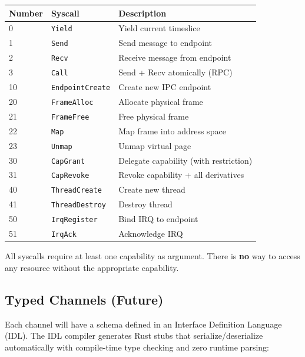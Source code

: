\documentclass[11pt,a4paper]{article}
\begin{document}
\begin{center}
\begin{tabularx}{\textwidth}{llX}
\toprule
\textbf{Number} & \textbf{Syscall} & \textbf{Description} \\
\midrule
0  & \texttt{Yield}          & Yield current timeslice \\
1  & \texttt{Send}           & Send message to endpoint \\
2  & \texttt{Recv}           & Receive message from endpoint \\
3  & \texttt{Call}           & Send + Recv atomically (RPC) \\
\midrule
10 & \texttt{EndpointCreate} & Create new IPC endpoint \\
\midrule
20 & \texttt{FrameAlloc}     & Allocate physical frame \\
21 & \texttt{FrameFree}      & Free physical frame \\
22 & \texttt{Map}            & Map frame into address space \\
23 & \texttt{Unmap}          & Unmap virtual page \\
\midrule
30 & \texttt{CapGrant}       & Delegate capability (with restriction) \\
31 & \texttt{CapRevoke}      & Revoke capability + all derivatives \\
\midrule
40 & \texttt{ThreadCreate}   & Create new thread \\
41 & \texttt{ThreadDestroy}  & Destroy thread \\
\midrule
50 & \texttt{IrqRegister}    & Bind IRQ to endpoint \\
51 & \texttt{IrqAck}         & Acknowledge IRQ \\
\bottomrule
\end{tabularx}
\end{center}

All syscalls require at least one capability as argument.
There is \textbf{no} way to access any resource without the appropriate capability.

\subsection{Typed Channels (Future)}

Each channel will have a schema defined in an Interface Definition Language (IDL).
The IDL compiler generates Rust stubs that serialize/deserialize automatically
with compile-time type checking and zero runtime parsing:
\end{document}
